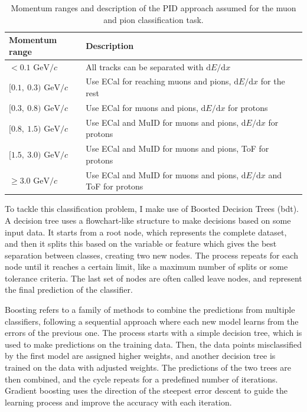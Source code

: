 \begin{table}[t]
	\caption{Momentum ranges and description of the PID approach assumed for the muon and pion classification task.}
	\begin{center}
		\begin{small}
			\begin{tabular}{p{2.7cm}|l}
				Momentum range                                    & Description                                                                          \\[1mm] \hline \rule{0pt}{1.1\normalbaselineskip}
				$< 0.1$ \hfill $\mathrm{GeV}/c$      & All tracks can be separated with $\mathrm{d}E/\mathrm{d}x$                           \\[2mm]
				$[0.1,~0.3)$ \hfill $\mathrm{GeV}/c$ & Use ECal for reaching muons and pions, $\mathrm{d}E/\mathrm{d}x$ for the rest        \\[2mm]
				$[0.3,~0.8)$ \hfill $\mathrm{GeV}/c$ & Use ECal for muons and pions, $\mathrm{d}E/\mathrm{d}x$ for protons                  \\[2mm]
				$[0.8,~1.5)$ \hfill $\mathrm{GeV}/c$ & Use ECal and MuID for muons and pions,  $\mathrm{d}E/\mathrm{d}x$ for protons        \\[2mm]
				$[1.5,~3.0)$ \hfill $\mathrm{GeV}/c$ & Use ECal and MuID for muons and pions, ToF for protons                               \\[2mm]
				$\geq 3.0$ \hfill $\mathrm{GeV}/c$   & Use ECal and MuID for muons and pions, $\mathrm{d}E/\mathrm{d}x$ and ToF for protons
			\end{tabular}
		\end{small}
	\end{center}
	\label{tab:bdt_regions}
\end{table}

To tackle this classification problem, I make use of Boosted Decision Trees (\gls{bdt}). A decision tree uses a flowchart-like structure to make decisions based on some input data. It starts from a root node, which represents the complete dataset, and then it splits this based on the variable or feature which gives the best separation between classes, creating two new nodes. The process repeats for each node until it reaches a certain limit, like a maximum number of splits or some tolerance criteria. The last set of nodes are often called leave nodes, and represent the final prediction of the classifier.

Boosting refers to a family of methods to combine the predictions from multiple classifiers, following a sequential approach where each new model learns from the errors of the previous one. The process starts with a simple decision tree, which is used to make predictions on the training data. Then, the data points misclassified by the first model are assigned higher weights, and another decision tree is trained on the data with adjusted weights. The predictions of the two trees are then combined, and the cycle repeats for a predefined number of iterations. Gradient boosting uses the direction of the steepest error descent to guide the learning process and improve the accuracy with each iteration.

